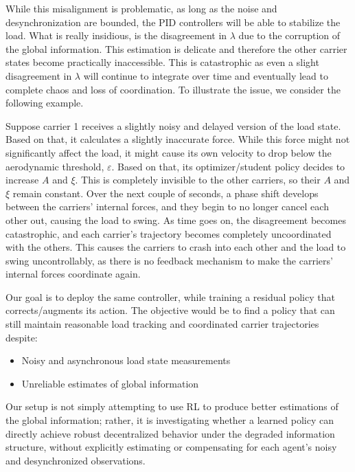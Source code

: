 While this misalignment is problematic, as
long as the noise and desynchronization are bounded, the PID controllers
will be able to stabilize the load. What is really insidious, is the
disagreement in $\lambda$ due to the corruption of the global
information. This estimation is delicate and therefore the other
carrier states become practically inaccessible. This is catastrophic as
even a slight disagreement in $\lambda$ will continue to integrate over
time and eventually lead to complete chaos and loss of coordination. To
illustrate the issue, we consider the following example.

Suppose carrier 1 receives a slightly noisy and delayed version of the
load state. Based on that, it calculates a slightly inaccurate force.
While this force might not significantly affect the load, it might
cause its own velocity to drop below the aerodynamic threshold,
$\varepsilon$. Based on that, its optimizer/student policy decides to 
increase $A$ and
$\xi$. This is completely invisible to the other carriers, so their $A$
and $\xi$ remain constant. Over the next couple of seconds, a phase
shift develops between the carriers’ internal forces, and they begin to
no longer cancel each other out, causing the load to swing. As time goes
on, the disagreement becomes catastrophic, and each carrier’s trajectory
becomes completely uncoordinated with the others. This causes the
carriers to crash into each other and the load to swing uncontrollably,
as there is no feedback mechanism to make the carriers’ internal forces
coordinate again.

Our goal is to deploy the same controller, while training a residual
policy that corrects/augments its action. The objective would be to
find a policy that can still maintain reasonable load tracking and
coordinated carrier trajectories despite:

\begin{itemize}
  \item Noisy and asynchronous load state measurements
  \item Unreliable estimates of global information
\end{itemize}

Our setup is not simply attempting to use RL to produce better
estimations of the global information; rather, it is investigating
whether a learned policy can directly achieve robust decentralized
behavior under the degraded information structure, without explicitly
estimating or compensating for each agent's noisy and desynchronized
observations.

